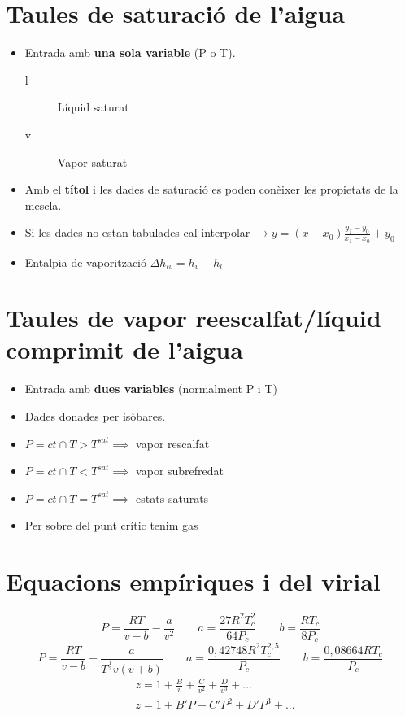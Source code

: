 \documentclass[a4paper]{article}
\begin{document}
\section{Taules de saturació de l'aigua}
\begin{itemize}
	\item Entrada amb \textbf{una sola variable} (P o T).
	\begin{description}
		\item[l] Líquid saturat
		\item[v] Vapor saturat
	\end{description}
	\item Amb el \textbf{títol} i les dades de saturació es poden conèixer les propietats de la mescla.
	\item Si les dades no estan tabulades cal interpolar 
	$\rightarrow y = (x - x_0) \frac{y_1 - y_0}{x_1 - x_0} + y_0$
	\item Entalpia de vaporització $\Delta h_{lv} = h_v - h_l$
\end{itemize}

\section{Taules de vapor reescalfat/líquid comprimit de l'aigua}
\begin{itemize}
	\item Entrada amb \textbf{dues variables} (normalment P i T)
	\item Dades donades per isòbares.
	\item $P=ct \cap T > T^{sat} \implies$ vapor rescalfat
	\item $P=ct \cap T < T^{sat} \implies$ vapor subrefredat
	\item $P=ct \cap T = T^{sat} \implies$ estats saturats
	\item Per sobre del punt crític tenim gas
\end{itemize}

\section{Equacions empíriques i del virial}

\begin{equation*}
	\tag{Equació Van der Waals}
	P = \frac{R T}{v - b} - \frac{a}{v^2} \qquad 
	a = \frac{27 R^2 T_c^2}{64 P_c} \qquad
	b = \frac{R T_c}{8 P_c}
\end{equation*}
\begin{equation*}
	\tag{Equació Redling-Kwong}
	P = \frac{R T}{v - b} - \frac{a}{T^{\frac{1}{2}} v (v + b)} \qquad
	a = \frac{0,42748 R^2 T_c^{2,5}}{P_c} \qquad
	b = \frac{0,08664 R T_c}{P_c}
\end{equation*}
\begin{align*}
	\tag{Equacions del Virial}
	& z = 1 + \frac{B}{v} + \frac{C}{v^2} + \frac{D}{v^3} + ... \\
	& z = 1 + B'P + C'P^2 + D'P^3 + ...
\end{align*}
\end{document}
